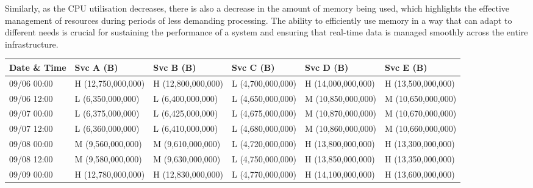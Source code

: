 \documentclass{ieeeaccess}
\begin{document}
Similarly, as the CPU utilisation decreases, there is also a decrease in the amount of memory being used, which highlights the effective management of resources during periods of less demanding processing. The ability to efficiently use memory in a way that can adapt to different needs is crucial for sustaining the performance of a system and ensuring that real-time data is managed smoothly across the entire infrastructure.

\begin{table}

  \centering

  \scriptsize %

  \setlength{\tabcolsep}{10pt} %

  \begin{tabular}{|l|l|l|l|l|l|}

  \hline

  \textbf{Date \& Time} & \textbf{Svc A (B)} & \textbf{Svc B (B)} & \textbf{Svc C (B)} & \textbf{Svc D (B)} & \textbf{Svc E (B)} \\ \hline

  09/06 00:00 & H (12,750,000,000) & H (12,800,000,000) & L (4,700,000,000) & H (14,000,000,000) & H (13,500,000,000) \\ \hline

  09/06 12:00 & L (6,350,000,000)  & L (6,400,000,000)  & L (4,650,000,000) & M (10,850,000,000) & M (10,650,000,000) \\ \hline

  09/07 00:00 & L (6,375,000,000)  & L (6,425,000,000)  & L (4,675,000,000) & M (10,870,000,000) & M (10,670,000,000) \\ \hline

  09/07 12:00 & L (6,360,000,000)  & L (6,410,000,000)  & L (4,680,000,000) & M (10,860,000,000) & M (10,660,000,000) \\ \hline

  09/08 00:00 & M (9,560,000,000)  & M (9,610,000,000)  & L (4,720,000,000) & H (13,800,000,000) & H (13,300,000,000) \\ \hline

  09/08 12:00 & M (9,580,000,000)  & M (9,630,000,000)  & L (4,750,000,000) & H (13,850,000,000) & H (13,350,000,000) \\ \hline

  09/09 00:00 & H (12,780,000,000) & H (12,830,000,000) & L (4,770,000,000) & H (14,100,000,000) & H (13,600,000,000) \\ \hline


\end{tabular}
\end{table}
\end{document}
